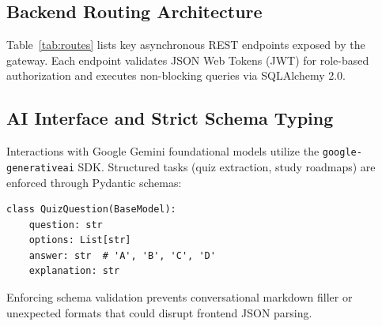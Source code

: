 \documentclass[conference]{IEEEtran}
\begin{document}
\subsection{Backend Routing Architecture}
Table~\ref{tab:routes} lists key asynchronous REST endpoints exposed by the gateway. Each endpoint validates JSON Web Tokens (JWT) for role-based authorization and executes non-blocking queries via SQLAlchemy 2.0.

\begin{table}[htbp]
\caption{Primary Asynchronous REST API Routes}
\label{tab:routes}
\centering
{}
\end{table}

\subsection{AI Interface and Strict Schema Typing}
Interactions with Google Gemini foundational models utilize the \texttt{google-generativeai} SDK. Structured tasks (quiz extraction, study roadmaps) are enforced through Pydantic schemas:
\begin{verbatim}
class QuizQuestion(BaseModel):
    question: str
    options: List[str]
    answer: str  # 'A', 'B', 'C', 'D'
    explanation: str
\end{verbatim}
Enforcing schema validation prevents conversational markdown filler or unexpected formats that could disrupt frontend JSON parsing.
\end{document}
